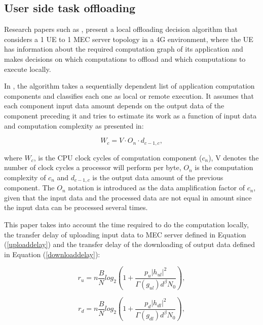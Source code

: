 \subsection{User side task offloading}
\noindent Research papers such as \cite{taskclass1}, \cite{taskclass2} present a local offloading decision algorithm that considers a 1 \acrshort{UE} to 1 \acrshort{MEC} server topology in a 4G environment, where the \acrshort{UE} has information about the required computation graph of its application and makes decisions on which computations to offload and which computations to execute locally. 

In \cite{taskclass1}, the algorithm takes a sequentially dependent list of application computation components  and classifies each one as local or remote execution. It assumes that each component input data amount depends on the output data of the component preceding it and tries to estimate its work as a function of input data and computation complexity as presented in:

\begin{equation} 
    W_c = V \cdot O_n \cdot d_{c-1, c}, 
\end{equation}\label{wcv}

where $W_c$, is the \acrshort{CPU} clock cycles of computation component ($c_n$), V denotes the number of clock cycles a processor will perform per byte, $O_n$ is the computation complexity of $c_n$ and $d_{c-1,c}$ is the output data amount of the previous component. The $O_n$ notation is introduced as the data amplification factor of $c_n$, given that the input data and the processed data are not equal in amount since the input data can be processed several times.

This paper takes into account the time required to do the computation locally, the transfer delay of uploading input data to \acrshort{MEC} server defined in Equation (\ref{uploaddelay}) and the transfer delay of the downloading of output data defined in Equation (\ref{downloaddelay}):

\begin{equation}\label{uploaddelay}
r_u = n \frac{B}{N} log_2(1+\frac{p_u|h_{ul}|^2}{\Gamma(g_{ul})d^\beta N_0}),
\end{equation}

\begin{equation}\label{downloaddelay}
r_d = n \frac{B}{N} log_2(1+\frac{p_d|h_{dl}|^2}{\Gamma(g_{dl})d^\beta N_0}),
\end{equation}

